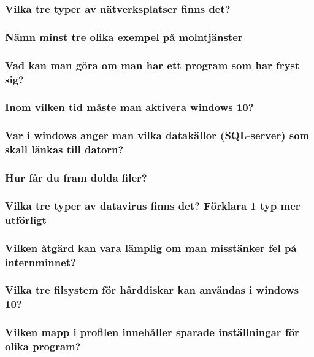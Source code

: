 \subsubsection{Vilka tre typer av nätverksplatser finns det?}

\subsubsection{Nämn minst tre olika exempel på molntjänster}

\subsubsection{Vad kan man göra om man har ett program som har fryst sig?}

\subsubsection{Inom vilken tid måste man aktivera windows 10?}

\subsubsection{Var i windows anger man vilka datakällor (SQL-server) som skall länkas till datorn?}

\subsubsection{Hur får du fram dolda filer?}

\subsubsection{Vilka tre typer av datavirus finns det? Förklara 1 typ mer utförligt}

\subsubsection{Vilken åtgärd kan vara lämplig om man misstänker fel på internminnet?}

\subsubsection{Vilka tre filsystem för hårddiskar kan användas i windows 10?}

\subsubsection{Vilken mapp i profilen innehåller sparade inställningar för olika program?}

